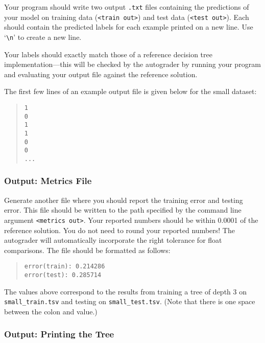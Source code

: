 \documentclass[11pt,addpoints,answers]{exam}
\begin{document}
Your program should write two output \lstinline{.txt} files containing the predictions of your model on training data (\lstinline{<train out>}) and test data (\lstinline{<test out>}). Each should contain the predicted labels for each example printed on a new line. Use `\texttt{\textbackslash n}' to create a new line.

Your labels should exactly match those of a reference decision tree implementation---this will be checked by the autograder by running your program and evaluating your output file against the reference solution.

%
The first few lines of an example output file is given below for the small dataset:
\begin{quote}
\begin{verbatim}
1
0
1
1
0
0
...
\end{verbatim}
\end{quote}

\subsubsection{Output: Metrics File}
\label{sec:metrics}

Generate another file where you should report the training error and testing error. This file should be written to the path specified by the command line argument \lstinline{<metrics out>}. Your reported numbers should be within 0.0001 of the reference solution. You do not need to round your reported numbers! The autograder will automatically incorporate the right tolerance for float comparisons. The file should be formatted as follows:

\begin{quote}
\begin{verbatim}
error(train): 0.214286
error(test): 0.285714
\end{verbatim}
\end{quote}

The values above correspond to the results from training a tree of depth 3 on \texttt{small\_train.tsv} and testing on \texttt{small\_test.tsv}. (Note that there is one space between the colon and value.)


\subsubsection{Output: Printing the Tree}
\label{sec:printtree}
\end{document}
